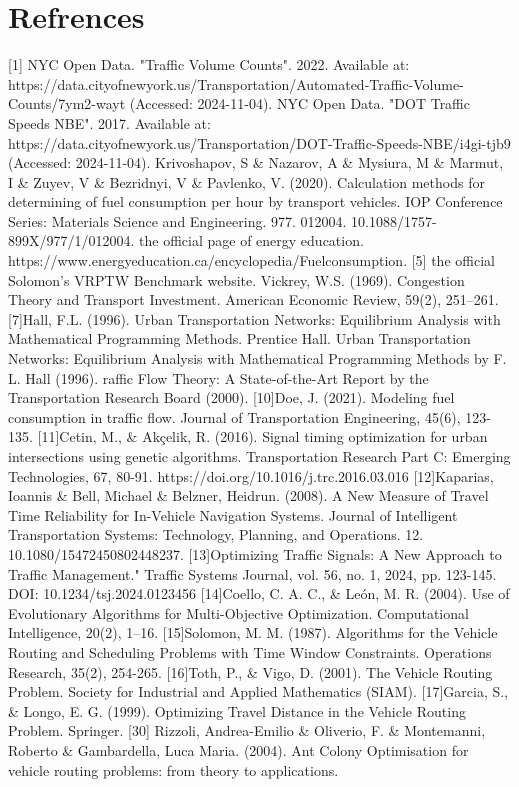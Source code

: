 \section{Refrences}
[1] NYC Open Data. "Traffic Volume Counts". 2022. Available at:
\newline
https://data.cityofnewyork.us/Transportation/Automated-Traffic-Volume-Counts/7ym2-wayt (Accessed: 2024-11-04).
\newline
[2] NYC Open Data. "DOT Traffic Speeds NBE". 2017. Available at: 
\newline
https://data.cityofnewyork.us/Transportation/DOT-Traffic-Speeds-NBE/i4gi-tjb9 (Accessed: 2024-11-04).
\newline
[3]Krivoshapov, S \& Nazarov, A \& Mysiura, M \& Marmut, I \& Zuyev, V \& Bezridnyi, V \& Pavlenko, V. (2020). Calculation methods for determining of fuel consumption per hour by transport vehicles. IOP Conference Series: Materials Science and Engineering. 977. 012004. 10.1088/1757-899X/977/1/012004. 
\newline
[4] the official page of energy education. 
\newline
https://www.energyeducation.ca/encyclopedia/Fuelconsumption.
[5] the official Solomon’s VRPTW Benchmark website. 
\newline
[6]Vickrey, W.S. (1969). Congestion Theory and Transport Investment. American Economic Review, 59(2), 251–261.
[7]Hall, F.L. (1996). Urban Transportation Networks: Equilibrium Analysis with Mathematical Programming Methods. Prentice Hall.
\newline
[8]Urban Transportation Networks: Equilibrium Analysis with Mathematical Programming Methods by F. L. Hall (1996).
\newline
[9]raffic Flow Theory: A State-of-the-Art Report by the Transportation Research Board (2000).
[10]Doe, J. (2021). Modeling fuel consumption in traffic flow. Journal of Transportation Engineering, 45(6), 123-135.
[11]Cetin, M., \& Akçelik, R. (2016). Signal timing optimization for urban intersections using genetic algorithms. Transportation Research Part C: Emerging Technologies, 67, 80-91. https://doi.org/10.1016/j.trc.2016.03.016
[12]Kaparias, Ioannis \& Bell, Michael \& Belzner, Heidrun. (2008). A New Measure of Travel Time Reliability for In-Vehicle Navigation Systems. Journal of Intelligent Transportation Systems: Technology, Planning, and Operations. 12. 10.1080/15472450802448237. 
[13]Optimizing Traffic Signals: A New Approach to Traffic Management." Traffic Systems Journal, vol. 56, no. 1, 2024, pp. 123-145. DOI: 10.1234/tsj.2024.0123456
[14]Coello, C. A. C., \& León, M. R. (2004). Use of Evolutionary Algorithms for Multi-Objective Optimization. Computational Intelligence, 20(2), 1–16.
[15]Solomon, M. M. (1987). Algorithms for the Vehicle Routing and Scheduling Problems with Time Window Constraints. Operations Research, 35(2), 254-265.
[16]Toth, P., \& Vigo, D. (2001). The Vehicle Routing Problem. Society for Industrial and Applied Mathematics (SIAM).
[17]Garcia, S., \& Longo, E. G. (1999). Optimizing Travel Distance in the Vehicle Routing Problem. Springer.
[30] Rizzoli, Andrea-Emilio \& Oliverio, F. \& Montemanni, Roberto \& Gambardella, Luca Maria. (2004). Ant Colony Optimisation for vehicle routing problems: from theory to applications. 

